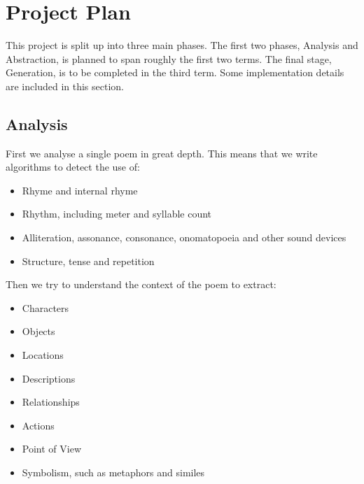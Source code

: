 \def\baselinestretch{1}
\chapter{Project Plan}
\ifpdf
    \graphicspath{{Theory/TheoryFigs/PNG/}{Theory/TheoryFigs/PDF/}{Theory/TheoryFigs/}}
\else
    \graphicspath{{Theory/TheoryFigs/EPS/}{Theory/TheoryFigs/}}
\fi

\def\baselinestretch{1.66}

This project is split up into three main phases. The first two phases, Analysis and Abstraction, is planned to span roughly the first two terms. The final stage, Generation, is to be completed in the third term. Some implementation details are included in this section.

\section{Analysis}

First we analyse a single poem in great depth. This means that we write algorithms to detect the use of:
\begin{itemize}
\setlength{\itemsep}{0pt}
\item{Rhyme and internal rhyme}
\item{Rhythm, including meter and syllable count}
\item{Alliteration, assonance, consonance, onomatopoeia and other sound devices}
\item{Structure, tense and repetition}
\end{itemize}

Then we try to understand the context of the poem to extract:
\begin{itemize}
\setlength{\itemsep}{0pt}
\item{Characters}
\item{Objects}
\item{Locations}
\item{Descriptions}
\item{Relationships}
\item{Actions}
\item{Point of View}
\item{Symbolism, such as metaphors and similes}
\end{itemize}


